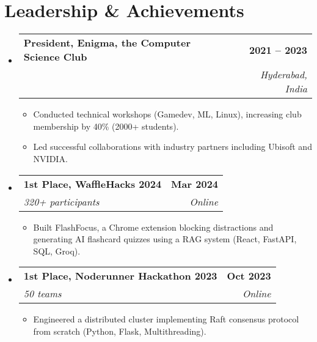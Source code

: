 \documentclass[letterpaper,11pt]{article}
\makeatletter
\newcommand{\resumeItem}[1]{
  \item\small{
    {#1 \vspace{-2pt}}
  }
}
\newcommand{\resumeSubheading}[4]{
  \vspace{-2pt}\item
    \begin{tabular*}{1.0\textwidth}[t]{l@{\extracolsep{\fill}}r}
      \textbf{#1} & \textbf{\small #2} \\
      \textit{\small#3} & \textit{\small #4} \\
    \end{tabular*}\vspace{-7pt}
}
\newcommand{\resumeSubHeadingListStart}{\begin{itemize}[leftmargin=0.0in, label={}]}
\newcommand{\resumeSubHeadingListEnd}{\end{itemize}}
\newcommand{\resumeItemListStart}{\begin{itemize}}
\newcommand{\resumeItemListEnd}{\end{itemize}\vspace{-5pt}}
\makeatother
\begin{document}
\section{Leadership \& Achievements}
    \resumeSubHeadingListStart
        \resumeSubheading{President, Enigma, the Computer Science Club}{2021 -- 2023}{}{Hyderabad, India}
            \resumeItemListStart
                \resumeItem{Conducted technical workshops (Gamedev, ML, Linux), increasing club membership by 40\% (2000+ students).}
                \resumeItem{Led successful collaborations with industry partners including Ubisoft and NVIDIA.}
            \resumeItemListEnd
        \resumeSubheading{1st Place, WaffleHacks 2024}{Mar 2024}{320+ participants}{Online}
            \resumeItemListStart
                \resumeItem{Built FlashFocus, a Chrome extension blocking distractions and generating AI flashcard quizzes using a RAG system (React, FastAPI, SQL, Groq).}
            \resumeItemListEnd
        \resumeSubheading{1st Place, Noderunner Hackathon 2023}{Oct 2023}{50 teams}{Online}
            \resumeItemListStart
                \resumeItem{Engineered a distributed cluster implementing Raft consensus protocol from scratch (Python, Flask, Multithreading).}
            \resumeItemListEnd
    \resumeSubHeadingListEnd
\end{document}
